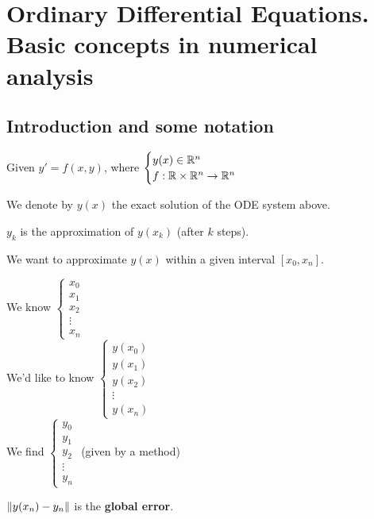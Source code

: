 \section{Ordinary Differential Equations. Basic concepts in numerical analysis}

\subsection{Introduction and some notation}

Given $y' = f(x,y)$, where $\begin{cases} y(x) \in \mathbb{R}^n\\ f:\mathbb{R}\times\mathbb{R}^n \to \mathbb{R}^n\end{cases}$

\begin{definition}
  We denote by $y(x)$ the exact solution of the ODE system above.
\end{definition}

\begin{definition}
  $y_k$ is the approximation of $y(x_k)$ (after $k$ steps).
\end{definition}

\begin{objective}
  We want to approximate $y(x)$ within a given interval $[x_0, x_n]$. \\
  \footnotesize{
  \begin{multicols}{3}
    We know $\begin{cases}x_0\\x_1\\x_2\\\vdots\\x_n \end{cases}$\\
    \-\hspace{-2cm}We'd like to know $\begin{cases}y(x_0)\\y(x_1)\\y(x_2)\\\vdots \\y(x_n) \end{cases}$\\
    \-\hspace{-2cm}We find $\begin{cases} y_0\\y_1\\y_2\\\vdots \\y_n \end{cases}$ (given by a method)
  \end{multicols}
  }
\end{objective}
\normalsize
\begin{definition}
  $\left\lVert y(x_n) - y_n\right\rVert$ is the \textbf{global error}.
\end{definition}

